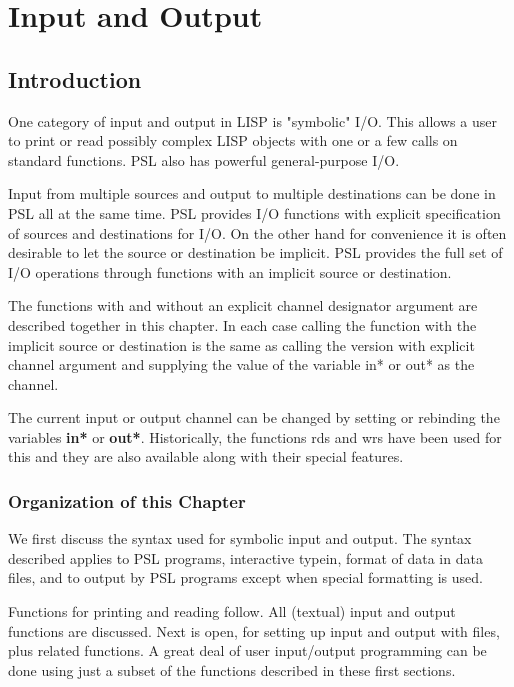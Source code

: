 \chapter{Input and Output}

\section{Introduction}

One category of input and output in LISP is "symbolic" I/O.
This allows a user to print or read possibly complex LISP
objects with one or a few calls on standard functions. PSL also
has powerful general-purpose I/O.

Input from multiple sources and output to multiple destinations
can be done in PSL all  at  the  same  time.  PSL
provides  I/O  functions  with explicit specification of sources
and destinations for I/O.  On the other hand for convenience  it
is often desirable to let the source or destination be implicit.
PSL  provides  the  full set of I/O operations through functions
with an implicit source or destination.

  The functions with and without an explicit channel  designator
argument  are  described together in this chapter.  In each case
calling the function with the implicit source or destination  is
the  same  as calling the version with explicit channel argument
and supplying the value of the  variable  in*  or  out*  as  the
channel.

  The  current input or output channel can be changed by setting
or rebinding the variables {\bf in*}  or {\bf out*}.  
  Historically,  the
functions  rds and wrs have been used for this and they are also
available along with their special features.

\subsection{Organization of this Chapter}

  We first discuss  the  syntax  used  for  symbolic  input  and
output.    The   syntax   described  applies  to  PSL  programs,
interactive typein, format of data in data files, and to  output
by PSL programs except when special formatting is used.

  Functions  for  printing  and  reading  follow.  All (textual)
input and output functions are discussed.   Next  is  open,  for
setting  up input and output with files, plus related functions.
A great deal of user input/output programming can be done  using
just  a  subset  of  the  functions  described  in  these  first
sections.

